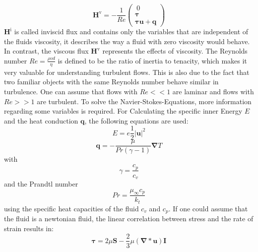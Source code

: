 \documentclass[a4paper,12pt]{article}
\renewcommand*\vec[1]{\boldsymbol{#1}}
\renewcommand*\matrix[1]{\boldsymbol{#1}}
\numberwithin{equation}{section} %
\begin{document}
\begin{equation}
 \vec{H^\mathrm{v}} = - \frac{1}{Re} \left( \begin{array}{c}\ 0 \\ \matrix{\tau}\\ \matrix{\tau} \vec{u} + \vec{q} \end{array} \right)
\end{equation}
\nomenclature{$\matrix{\tau}$}{Stress tensor}
\nomenclature{$\vec{q}$}{Heat conduction}
$ \vec{H^\mathrm{i}} $ is called inviscid flux and contains only the variables that are independent of the fluids viscosity, it describes the way a fluid 
with zero viscosity would behave. In contrast, the viscous flux $ \vec{H^\mathrm{v}} $ represents the effects of viscosity. The Reynolds number 
$ Re = \frac{\rho v d}{\eta} $ is defined to be the ratio of inertia to tenacity, which makes it very valuable for understanding turbulent flows. This is also due to the 
fact that two familiar objects with the same Reynolds number behave similar in turbulence. One can assume that flows with $ Re << 1 $ are laminar and flows with 
$ Re >> 1 $ are turbulent.
To solve the Navier-Stokes-Equations, more information regarding some variables is required. For Calculating the specific inner Energy $ E $ 
and the heat conduction $ \vec{q} $, the following equations are used:
\begin{equation}
 E = e  \frac{1}{2} \vec{|u|}^2
\end{equation}
\begin{equation}
 \vec{q} = - \frac{\mu}{Pr (\gamma - 1)} \vec\nabla T
\end{equation}
with 
\begin{equation}
 \gamma = \frac{c_p}{c_v}
\end{equation}
and the Prandtl number
\begin{equation}
 Pr = \frac{\mu_\infty c_p}{k_t}
\end{equation}
using the specific heat capacities of the fluid $ c_v $ and $ c_p $.
If one could assume that the fluid is a newtonian fluid, the linear correlation between stress and the rate of strain results in:
\begin{equation}
 \matrix{\tau} = 2 \mu \matrix{S} - \frac{2}{3} \mu (\vec\nabla * \vec{u}) \matrix{I}
\end{equation}
\end{document}
